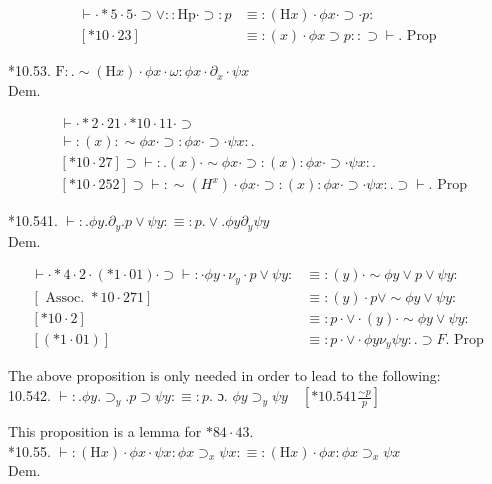 \documentclass[10pt]{article}
\begin{document}
$$
\begin{aligned}
\vdash \cdot * 5 \cdot 5 \cdot \supset \vee:: \mathrm{Hp} \cdot \supset: p & \equiv:(\mathrm{H} x) \cdot \phi x \cdot \supset \cdot p: \\
{[* 10 \cdot 23] } & \equiv:(x) \cdot \phi x \supset p:: \supset \vdash . \text { Prop }
\end{aligned}
$$

*10.53. $\mathrm{F}: . \sim(\mathrm{H} x) \cdot \phi x \cdot \omega: \phi x \cdot \partial_{x} \cdot \psi x$\\
Dem.

$$
\begin{aligned}
& \vdash \cdot * 2 \cdot 21 \cdot * 10 \cdot 11 \cdot \supset \\
& \vdash:(x): \sim \phi x \cdot \supset: \phi x \cdot \supset \cdot \psi x: . \\
& {[* 10 \cdot 27] \supset \vdash: .(x) \cdot \sim \phi x \cdot \supset:(x): \phi x \cdot \supset \cdot \psi x: .} \\
& {[* 10 \cdot 252] \supset \vdash: \sim\left(H^{x}\right) \cdot \phi x \cdot \supset:(x): \phi x \cdot \supset \cdot \psi x: . \supset \vdash . \text { Prop }}
\end{aligned}
$$

*10.541. $\vdash: . \phi y . \partial_{y} . p \vee \psi y: \equiv: p . \vee . \phi y \partial_{y} \psi y$\\
Dem.

$$
\begin{array}{ll}
\vdash \cdot * 4 \cdot 2 \cdot(* 1 \cdot 01) \cdot \supset \vdash: \cdot \phi y \cdot \nu_{y} \cdot p \vee \psi y: & \equiv:(y) \cdot \sim \phi y \vee p \vee \psi y: \\
{[\text { Assoc. } * 10 \cdot 271]} & \equiv:(y) \cdot p \vee \sim \phi y \vee \psi y: \\
{[* 10 \cdot 2]} & \equiv: p \cdot \vee \cdot(y) \cdot \sim \phi y \vee \psi y: \\
{[(* 1 \cdot 01)]} & \equiv: p \cdot \vee \cdot \phi y \nu_{y} \psi y: . \supset F . \text { Prop }
\end{array}
$$

The above proposition is only needed in order to lead to the following:\\
10.542. $\vdash: . \phi y . \supset_{y} . p \supset \psi y: \equiv: p$. ɔ. $\phi y \supset_{y} \psi y \quad\left[* 10.541 \frac{\sim p}{p}\right]$

This proposition is a lemma for $* 84 \cdot 43$.\\
*10.55. $\vdash:(\mathrm{H} x) \cdot \phi x \cdot \psi x: \phi x \supset_{x} \psi x: \equiv:(\mathrm{H} x) \cdot \phi x: \phi x \supset_{x} \psi x$\\
Dem.
\end{document}
